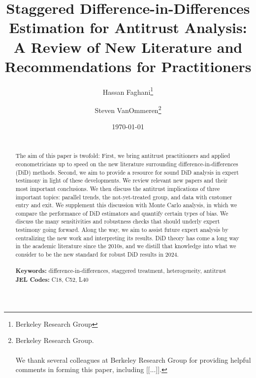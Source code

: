\documentclass[12pt]{article}
\begin{document}
\begin{titlepage}
\title{Staggered Difference-in-Differences Estimation for Antitrust Analysis: A Review of New Literature and Recommendations for Practitioners}
\author{Hassan Faghani\thanks{Berkeley Research Group} \and Steven VanOmmeren\thanks{Berkeley Research Group. \\\\ We thank several colleagues at Berkeley Research Group for providing helpful comments in forming this paper, including [[...]].}}
\date{\today}
\maketitle
\begin{abstract}
\noindent \\
The aim of this paper is twofold: First, we bring antitrust practitioners and applied econometricians up to speed on the new literature surrounding difference-in-differences (DiD) methods. Second, we aim to provide a resource for sound DiD analysis in expert testimony in light of these developments. We review relevant new papers and their most important conclusions. We then discuss the antitrust implications of three important topics: parallel trends, the not-yet-treated group, and data with customer entry and exit. We supplement this discussion with Monte Carlo analysis, in which we compare the performance of DiD estimators and quantify certain types of bias. We discuss the many sensitivities and robustness checks that should underly expert testimony going forward. Along the way, we aim to assist future expert analysis by centralizing the new work and interpreting its results. DiD theory has come a long way in the academic literature since the 2010s, and we distill that knowledge into what we consider to be the new standard for robust DiD results in 2024.\\
\vspace{0in}\\
\noindent\textbf{Keywords:} difference-in-differences, staggered treatment, heterogeneity, antitrust
\vspace{0in}\\
\noindent\textbf{JEL Codes:} C18, C52, L40\\

\bigskip
\end{abstract}
\setcounter{page}{0}
\thispagestyle{empty}
\end{titlepage}
\pagebreak \newpage


\tableofcontents
\end{document}
